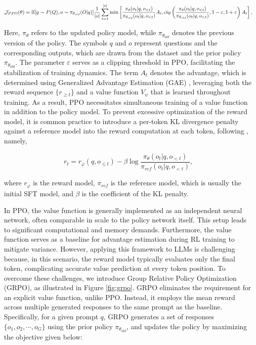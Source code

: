 \begin{itemize}[topsep=0pt]
\begin{itemize}[topsep=0pt]
\begin{equation}
\footnotesize
    \mathcal{J}_{PPO}(\theta) = \mathbb{E}{[q \sim P(Q), o \sim \pi_{\theta_{old}}(O|q)]} \frac{1}{|o|} \sum_{t=1}^{|o|} \min \left[ \frac{\pi_\theta(o_{t} | q, o_{<t})}{\pi_{\theta_{old}}(o_{t} | q, o_{<t})} A_{t}, \text{clip} \left( \frac{\pi_\theta(o_{t} | q, o_{<t})}{\pi_{\theta_{old}}(o_{t} | q, o_{<t})}, 1 - \varepsilon, 1 + \varepsilon \right)  A_{t} \right] ,
\end{equation}

Here, $\pi_{\theta}$ refers to the updated policy model, while $\pi_{\theta_{old}}$ denotes the previous version of the policy. The symbols $q$ and $o$ represent questions and the corresponding outputs, which are drawn from the dataset and the prior policy $\pi_{\theta_{old}}$. The parameter $\varepsilon$ serves as a clipping threshold in PPO, facilitating the stabilization of training dynamics. The term $A_t$ denotes the advantage, which is determined using Generalized Advantage Estimation (GAE) \citep{gae}, leveraging both the reward sequence $\{r_{\ge t}\}$ and a value function $V_{\psi}$ that is learned throughout training. As a result, PPO necessitates simultaneous training of a value function in addition to the policy model. To prevent excessive optimization of the reward model, it is common practice to introduce a per-token KL divergence penalty against a reference model into the reward computation at each token, following \citep{ouyang2022training}, namely,

\begin{equation}
    r_{t} = r_\varphi(q, o_{\le t}) - \beta \log\frac{\pi_{\theta}(o_{t}|q, o_{<t})}{\pi_{ref}(o_{t}|q, o_{<t})},
\label{eq:PPO-reward}
\end{equation}

where $r_\varphi$  is the reward model, $\pi_{ref}$ is the reference model, which is usually the initial SFT model, and $\beta$  is the coefficient of the KL penalty.

In PPO, the value function is generally implemented as an independent neural network, often comparable in scale to the policy network itself. This setup leads to significant computational and memory demands. Furthermore, the value function serves as a baseline for advantage estimation during RL training to mitigate variance. However, applying this framework to LLMs is challenging because, in this scenario, the reward model typically evaluates only the final token, complicating accurate value prediction at every token position. To overcome these challenges, we introduce Group Relative Policy Optimization (GRPO), as illustrated in Figure \ref{fig:grpo}. GRPO eliminates the requirement for an explicit value function, unlike PPO. Instead, it employs the mean reward across multiple generated responses to the same prompt as the baseline. Specifically, for a given prompt $q$, GRPO generates a set of responses $\{o_1, o_2, \cdots, o_G\}$ using the prior policy $\pi_{\theta_{old}}$, and updates the policy by maximizing the objective given below:


\end{itemize}
\end{itemize}
